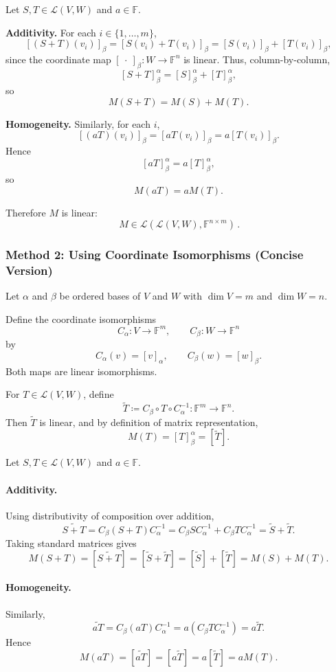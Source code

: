 \documentclass[12pt]{article}
\newcommand{\F}{\mathbb{F}}
\newcommand{\cL}{\mathcal{L}}
\begin{document}
Let $S,T\in\cL(V,W)$ and $a\in\F$.

\medskip
\noindent\textbf{Additivity.}
For each $i\in\{1,\dots,m\}$,
\[
[(S+T)(v_i)]_\beta = [S(v_i)+T(v_i)]_\beta = [S(v_i)]_\beta + [T(v_i)]_\beta,
\]
since the coordinate map $[\ \cdot\ ]_\beta:W\to\F^n$ is linear.
Thus, column-by-column,
\[
[S+T]_\beta^\alpha = [S]_\beta^\alpha + [T]_\beta^\alpha,
\]
so
\[
M(S+T)=M(S)+M(T).
\]

\medskip
\noindent\textbf{Homogeneity.}
Similarly, for each $i$,
\[
[(aT)(v_i)]_\beta = [aT(v_i)]_\beta = a[T(v_i)]_\beta.
\]
Hence
\[
[aT]_\beta^\alpha = a[T]_\beta^\alpha,
\]
so
\[
M(aT)=aM(T).
\]

Therefore $M$ is linear:
\[
\boxed{\,M\in \cL(\cL(V,W),\F^{n\times m})\,}.
\]
\subsubsection{Method 2: Using Coordinate Isomorphisms (Concise Version)}

Let $\alpha$ and $\beta$ be ordered bases of $V$ and $W$ with
$\dim V=m$ and $\dim W=n$.

Define the coordinate isomorphisms
\[
C_\alpha: V \to \F^m, \qquad
C_\beta: W \to \F^n
\]
by
\[
C_\alpha(v)=[v]_\alpha, \qquad
C_\beta(w)=[w]_\beta.
\]
Both maps are linear isomorphisms.

For $T\in\cL(V,W)$, define
\[
\widetilde{T}
\coloneqq
C_\beta \circ T \circ C_\alpha^{-1}
:
\F^m \to \F^n.
\]
Then $\widetilde{T}$ is linear, and by definition of matrix
representation,
\[
M(T)
=
[T]_\beta^\alpha
=
[\widetilde{T}].
\]

Let $S,T\in\cL(V,W)$ and $a\in\F$.

\paragraph{Additivity.}
Using distributivity of composition over addition,
\[
\widetilde{S+T}
=
C_\beta (S+T) C_\alpha^{-1}
=
C_\beta S C_\alpha^{-1}
+
C_\beta T C_\alpha^{-1}
=
\widetilde{S}+\widetilde{T}.
\]
Taking standard matrices gives
\[
M(S+T)
=
[\widetilde{S+T}]
=
[\widetilde{S}+\widetilde{T}]
=
[\widetilde{S}]+[\widetilde{T}]
=
M(S)+M(T).
\]

\paragraph{Homogeneity.}
Similarly,
\[
\widetilde{aT}
=
C_\beta (aT) C_\alpha^{-1}
=
a(C_\beta T C_\alpha^{-1})
=
a\widetilde{T}.
\]
Hence
\[
M(aT)
=
[\widetilde{aT}]
=
[a\widetilde{T}]
=
a[\widetilde{T}]
=
aM(T).
\]
\end{document}

